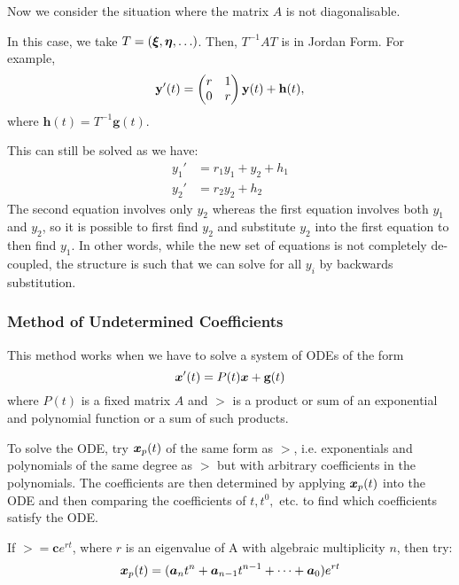 Now we consider the situation where the matrix $A$ is not diagonalisable.

In this case, we take $T = (\bm{\xi}, \bm{\eta}, \ldots)$. Then, $T^{-1}AT$ is in Jordan Form. For example,
\[
\textbf{y}'(t) = \begin{pmatrix}r & 1 \\0 & r\end{pmatrix} \textbf{y}(t) +\textbf{h}(t),
\]
where $\textbf{h}(t) = T^{-1}\textbf{g}(t)$.

This can still be solved as we have:
\begin{align*}
	y_1' &= r_1y_1 + y_2 + h_1 \\
	y_2' &= r_2y_2 + h_2
\end{align*}
The second equation involves only $y_2$ whereas the first equation involves both $y_1$ and $y_2$, so it is possible to first find $y_2$ and substitute $y_2$ into the first equation to then find $y_1$. In other words, while the new set of equations is not completely de-coupled, the structure is such that we can solve for all $y_i$ by backwards substitution.

\subsubsection{Method of Undetermined Coefficients}

This method works when we have to solve a system of ODEs of the form
\[
\bm{x}'(t) = P(t) \bm{x} + \textbf{g}(t)
\] 
where $P(t)$ is a fixed matrix $A$ and $\gt$ is a product or sum of an exponential and polynomial function or a sum of such products.

To solve the ODE, try $\bm{x}_p(t)$ of the same form as $\gt$, i.e. exponentials and polynomials of the same degree as $\gt$ but with arbitrary coefficients in the polynomials. The coefficients are then determined by applying $\bm{x}_p(t)$ into the ODE and then comparing the coefficients of $t, t^0, $ etc. to find which coefficients satisfy the ODE.

\begin{remark}[Exception:] If $\gt = \bm{c} e^{rt}$, where $r$ is an eigenvalue of A with algebraic multiplicity $n$, then try:
	\[
	\bm{x}_p(t) = (\bm{a}_n t^n+\bm{a}_{n-1} t^{n-1} + \cdots + \bm{a}_0)e^{rt}
	\]
\end{remark}

